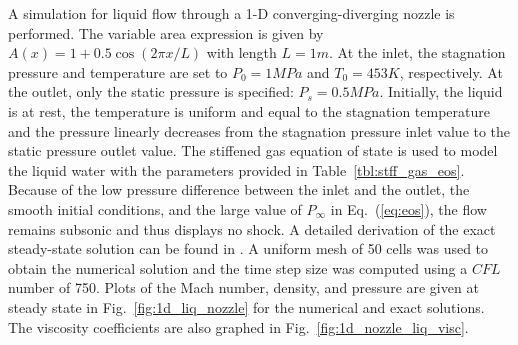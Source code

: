 \documentclass[preprint,10pt]{elsarticle}
\newcommand{\eqt}[1]{Eq.~(\ref{#1})}                     %
\newcommand{\fig}[1]{Fig.~\ref{#1}}                      %
\newcommand{\tbl}[1]{Table~\ref{#1}}                     %
\begin{document}
A simulation for liquid flow through a 1-D converging-diverging nozzle is performed. The variable area expression is given by 
$A(x) = 1 + 0.5 \cos(2 \pi x / L)$ with length $L=1m$.  At the inlet, the stagnation pressure and temperature are set 
to $P_0 = 1 MPa$ and $T_0 = 453 K$, respectively. At the outlet, only the static pressure is specified: $P_s = 0.5 MPa$. 
Initially, the liquid is at rest, the temperature is uniform and equal to the stagnation temperature and the pressure 
linearly decreases from the stagnation pressure inlet value to the static pressure outlet value. 
The stiffened gas equation of state is used to model the liquid water with the parameters provided in \tbl{tbl:stff_gas_eos}.
Because of the low pressure difference between the inlet and the outlet, the smooth initial conditions, 
and the large value of $P_\infty$ in \eqt{eq:eos}, the flow remains subsonic and thus displays no shock. A detailed 
derivation of the exact steady-state solution can be found in \cite{nozzle_exact}. A uniform mesh of 
50 cells was used to obtain the numerical solution and the time step size was computed using a $CFL$ number of 750.
Plots of the Mach number, density, and pressure are given at steady state in \fig{fig:1d_liq_nozzle} 
for the numerical and exact solutions. The viscosity coefficients are also graphed in \fig{fig:1d_nozzle_liq_visc}. 
\end{document}

